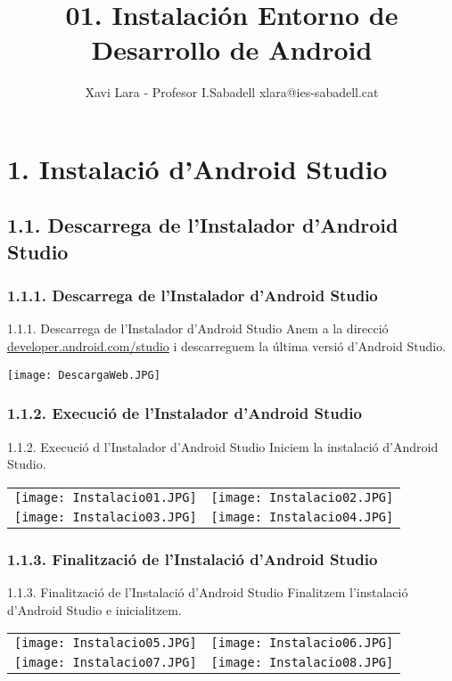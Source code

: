 \documentclass[12pt]{beamer}
\title{01. Instalación Entorno de Desarrollo de Android}
\author{Xavi Lara - Profesor I.Sabadell xlara@ies-sabadell.cat}
\institute{\texttt{[image: LogoInstitut.png]}}
\date{}
\begin{document}
	\begin{frame}
		\maketitle
	\end{frame}
	\section{1. Instalació d'Android Studio}
	\subsection{1.1. Descarrega de l'Instalador d'Android Studio}
	\subsubsection{1.1.1. Descarrega de l'Instalador d'Android Studio}
	\begin{frame}
		\begin{block}{1.1.1. Descarrega de l'Instalador d'Android Studio}
			Anem a la direcció  \textcolor{blue}{\href{https://developer.android.com/studio}{developer.android.com/studio}} i descarreguem la última versió d'Android Studio.
		\end{block}
		\centering\texttt{[image: DescargaWeb.JPG]}
	\end{frame}
	\subsubsection{1.1.2. Execució de l'Instalador d'Android Studio}
	\begin{frame}	
		\begin{block}{1.1.2. Execució d l'Instalador d'Android Studio}
			Iniciem la instalació d'Android Studio.
		\end{block}
		\centering
		\begin{tabular}{cc}
			\texttt{[image: Instalacio01.JPG]}&
			\texttt{[image: Instalacio02.JPG]}\\
			\texttt{[image: Instalacio03.JPG]}&
			\texttt{[image: Instalacio04.JPG]}\\
		\end{tabular}
	\end{frame}
	\subsubsection{1.1.3. Finalització de l'Instalació d'Android Studio}
	\begin{frame}
		\begin{block}{1.1.3. Finalització de l'Instalació d'Android Studio}
			Finalitzem l'instalació d'Android Studio e inicialitzem.
		\end{block}
		\centering
		\begin{tabular}{cc}
		\texttt{[image: Instalacio05.JPG]}&
		\texttt{[image: Instalacio06.JPG]}\\
		\texttt{[image: Instalacio07.JPG]}&
		\texttt{[image: Instalacio08.JPG]}\\
		\end{tabular}
	\end{frame}
\end{document}
